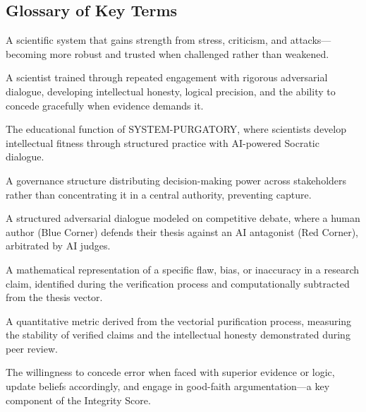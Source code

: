 \documentclass[11pt,a4paper]{article}
\begin{document}
\begin{small}
\section*{Glossary of Key Terms}

\begin{description}[style=nextline, leftmargin=0pt, labelindent=0pt, font=\normalfont\bfseries]
    \item[Antifragile Science] A scientific system that gains strength from stress, criticism, and attacks—becoming more robust and trusted when challenged rather than weakened.
    
    \item[Cognitive Athlete] A scientist trained through repeated engagement with rigorous adversarial dialogue, developing intellectual honesty, logical precision, and the ability to concede gracefully when evidence demands it.
    
    \item[Cognitive Gymnasium] The educational function of SYSTEM-PURGATORY, where scientists develop intellectual fitness through structured practice with AI-powered Socratic dialogue.
    
    \item[DAO (Decentralized Autonomous Organization)] A governance structure distributing decision-making power across stakeholders rather than concentrating it in a central authority, preventing capture.
    
    \item[Epistemological Boxing Match] A structured adversarial dialogue modeled on competitive debate, where a human author (Blue Corner) defends their thesis against an AI antagonist (Red Corner), arbitrated by AI judges.
    
    \item[Error Vector ($\vec{\epsilon}_j$)] A mathematical representation of a specific flaw, bias, or inaccuracy in a research claim, identified during the verification process and computationally subtracted from the thesis vector.
    
    \item[Integrity Score] A quantitative metric derived from the vectorial purification process, measuring the stability of verified claims and the intellectual honesty demonstrated during peer review.
    
    \item[Intellectual Honesty (H)] The willingness to concede error when faced with superior evidence or logic, update beliefs accordingly, and engage in good-faith argumentation—a key component of the Integrity Score.
    

\end{description}
\end{small}
\end{document}
